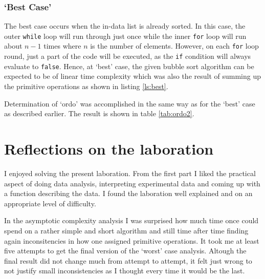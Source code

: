 \documentclass[a4paper,11pt,twoside]{article}
\begin{document}
\subsubsection{`Best Case'}
The best case occurs when the in-data list is already sorted. In this
case, the outer \verb!while! loop will run through just once while the
inner \verb!for! loop will run about $n-1$ times where $n$ is the
number of elements. However, on each \verb!for! loop round, just a
part of the code will be executed, as the \verb!if! condition will
always evaluate to \verb!false!. Hence, at `best' case, the given
bubble sort algorithm can be expected to be of linear time complexity
which was also the result of summing up the primitive operations as
shown in listing \ref{ls:best}.  

Determination of `ordo' was accomplished in the same way as for the
`best' case as described earlier. The result is shown in table
\ref{tab:ordo2}.

\section{Reflections on the laboration}
I enjoyed solving the present laboration. From the first part I liked
the practical aspect of doing data analysis, interpreting experimental
data and coming up with a function describing the data. I found the 
laboration well explained and on an appropriate level of difficulty. 

In the asymptotic complexity analysis I was surprised how much time
once could spend on a rather simple and short algorithm and still time
after time finding again inconsitencies in how one assigned primitive
operations. It took me at least five attempts to get the final version
of the `worst' case analysis. Altough the final result did not change
much from attempt to attempt, it felt just wrong to not justify small
inconsistencies as I thought every time it would be the last.



\end{document}
